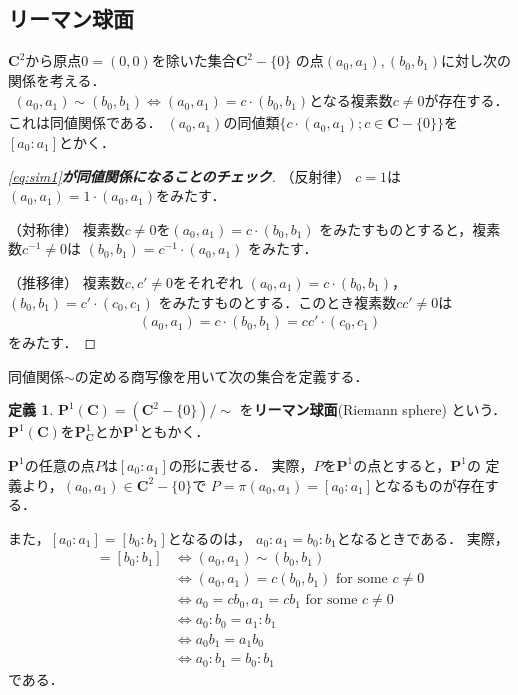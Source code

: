 \documentclass[11pt, a4paper, dvipdfmx]{jsarticle}
\theoremstyle{definition}
\newtheorem{Definition}[Axiom]{定義}
\newcommand{\cc}{\mathbf{C}}
\newcommand{\pp}{\mathbf{P}}
\theoremstyle{mystyle}
\numberwithin{equation}{section} %
\begin{document}
\subsection{リーマン球面}

$\cc^{2}$から原点$0=(0,0)$を除いた集合$\cc^{2}-\{0\}$
の点$(a_{0},a_{1}), (b_{0},b_{1})$に対し次の関係を考える．
\begin{align}\label{eq:sim1}
    (a_{0},a_{1})\sim (b_{0},b_{1})
    \Longleftrightarrow
    (a_{0},a_{1})= c\cdot(b_{0},b_{1})
    \text{となる複素数}c\neq0\text{が存在する．}
\end{align}
これは同値関係である．
$(a_0,a_1)$の同値類$\{c\cdot(a_0,a_1); c\in\cc-\{0\}\}$を
$[a_0\colon a_1]$とかく．
\begin{proof}[\eqref{eq:sim1}\textbf{が同値関係になることのチェック}]
    
    （反射律）
    $c=1$は$(a_{0},a_{1})= 1\cdot(a_{0},a_{1})$をみたす．

    （対称律）
    複素数$c\neq0$を$(a_{0},a_{1})= c \cdot (b_{0},b_{1})$
    をみたすものとすると，複素数$c^{-1}\neq0$は
    $(b_{0},b_{1})=c^{-1} \cdot(a_{0},a_{1})$
    をみたす．

    （推移律）
    複素数$c,c'\neq0$をそれぞれ
    $(a_{0},a_{1})= c \cdot (b_{0},b_{1})$，
    $(b_{0},b_{1})= c' \cdot (c_{0},c_{1})$
    をみたすものとする．このとき複素数$cc'\neq0$は
    \begin{align*}
        (a_{0},a_{1})
        = c \cdot (b_{0},b_{1})
        =cc' \cdot (c_{0},c_{1})
    \end{align*}
    をみたす．
\end{proof}

同値関係${\sim}$の定める商写像を用いて次の集合を定義する．

\begin{Definition}
    $\pp^{1}(\cc) = \left(\cc^{2}-\{0\}\right)/{\sim}$
    を\textbf{リーマン球面}(Riemann sphere) という．
    $\pp^{1}(\cc)$を$\pp^{1}_{\cc}$とか$\pp^{1}$ともかく．
\end{Definition}

$\pp^1$の任意の点$P$は$[a_0\colon a_1]$の形に表せる．
実際，$P$を$\pp^1$の点とすると，$\pp^1$の
定義より，$(a_{0},a_{1})\in \cc^{2}-\{0\}$で
$P=\pi(a_{0},a_{1})=[a_0\colon a_1]$となるものが存在する．

また，$[a_0\colon a_1]=[b_0\colon b_1]$となるのは，
$a_0\colon a_1=b_0\colon b_1$となるときである．
実際，
\begin{align*}
    [a_0\colon a_1]=[b_0\colon b_1]
    &\Longleftrightarrow
    (a_0, a_1)\sim(b_0, b_1)\\
    &\Longleftrightarrow
    (a_0, a_1)=c(b_0, b_1) \text{ for some }c\neq0\\
    &\Longleftrightarrow
    a_0=cb_0, a_1=cb_1 \text{ for some }c\neq0\\    
    &\Longleftrightarrow
    a_0\colon b_0 = a_1 \colon b_1\\
    &\Longleftrightarrow
    a_0 b_1 = a_1 b_0\\
    &\Longleftrightarrow
    a_0\colon b_1 = b_0 \colon b_1
\end{align*}
である．
\end{document}

